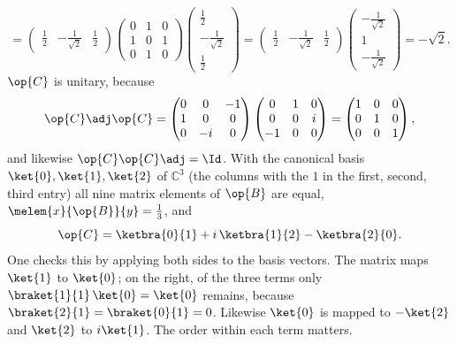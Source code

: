 \begin{example}
\begin{equation}
    = \begin{pmatrix} \frac12 & -\frac{1}{\sqrt{2}} & \frac12 \end{pmatrix}
      \begin{pmatrix} 0 & 1 & 0 \\ 1 & 0 & 1 \\ 0 & 1 & 0 \end{pmatrix}
      \begin{pmatrix} \frac12 \\ -\frac{1}{\sqrt{2}} \\ \frac12 \end{pmatrix}
    = \begin{pmatrix} \frac12 & -\frac{1}{\sqrt{2}} & \frac12 \end{pmatrix}
      \begin{pmatrix} -\frac{1}{\sqrt{2}} \\ 1 \\ -\frac{1}{\sqrt{2}} \end{pmatrix}
    = -\sqrt{2} .
  \end{equation}
  $\op{C}$ is unitary, because
  \begin{equation}\label{c03.eq.c-unitaer}
    \op{C}\adj\op{C}
    = \begin{pmatrix} 0 & 0 & -1 \\ 1 & 0 & 0 \\ 0 & -i & 0 \end{pmatrix}
      \begin{pmatrix} 0 & 1 & 0 \\ 0 & 0 & i \\ -1 & 0 & 0 \end{pmatrix}
    = \begin{pmatrix} 1 & 0 & 0 \\ 0 & 1 & 0 \\ 0 & 0 & 1 \end{pmatrix} ,
  \end{equation}
  and likewise $\op{C}\op{C}\adj = \Id$. With the canonical basis $\ket{0}, \ket{1}, \ket{2}$
  of $\mathbb{C}^3$ (the columns with the $1$ in the first, second, third entry) all nine
  matrix elements of $\op{B}$ are equal, $\melem{x}{\op{B}}{y} = \tfrac13$, and
  \begin{equation}\label{c03.eq.c-ketbra}
    \op{C} = \ketbra{0}{1} + i\, \ketbra{1}{2} - \ketbra{2}{0} .
  \end{equation}
  One checks this by applying both sides to the basis vectors. The matrix maps $\ket{1}$ to
  $\ket{0}$; on the right, of the three terms only $\braket{1}{1}\, \ket{0} = \ket{0}$ remains,
  because $\braket{2}{1} = \braket{0}{1} = 0$. Likewise $\ket{0}$ is mapped to $-\ket{2}$ and
  $\ket{2}$ to $i\ket{1}$. The order within each term matters.
\end{example}

